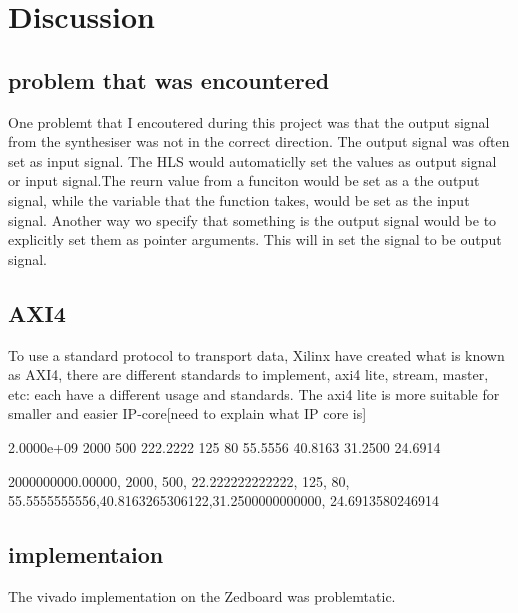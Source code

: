 \chapter{Discussion} \label{discussion}

\section{ problem that was encountered}
One problemt that I encoutered during this project was that the output signal from the synthesiser was not in the correct direction. The output signal was often set as input signal. The HLS would automaticlly set the values as output signal or input signal.The reurn value from a funciton would be set as a the output signal, while the variable that the function takes, would be set as the input signal. Another way wo specify that something is the output signal would be to explicitly set them as pointer arguments. This will in set the signal to be output signal.

\section{AXI4}
To use a standard protocol to transport data, Xilinx have created what is known as AXI4, there are different standards to implement, axi4 lite, stream, master, etc: each have a different usage and standards. The axi4 lite is more suitable for smaller and easier IP-core[need to explain what IP core is]


2.0000e+09	2000	500	222.2222	125	80	55.5556	40.8163	31.2500	24.6914

2000000000.00000, 2000, 500, 22.222222222222, 125, 80, 55.5555555556,40.8163265306122,31.2500000000000, 24.6913580246914

\section{implementaion}
The vivado implementation on the Zedboard was problemtatic.
